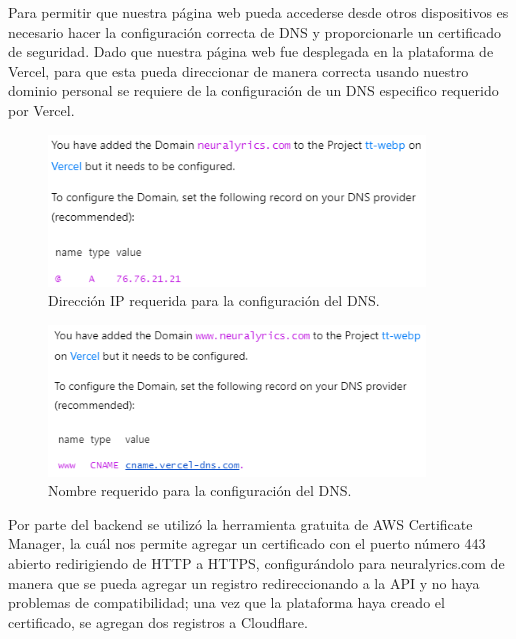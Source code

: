 \documentclass[12pt, a4paper, titlepage]{article}
\begin{document}
	Para permitir que nuestra página web pueda accederse desde otros dispositivos es necesario hacer la configuración correcta de DNS y proporcionarle un certificado de seguridad. Dado que nuestra página web fue desplegada en la plataforma de Vercel, para que esta pueda direccionar de manera correcta usando nuestro dominio personal se requiere de la configuración de un DNS especifico requerido por Vercel.
	\begin{figure}[H] 
		\includegraphics[width=10cm]{./Imagenes/DnsSSL/Dns1.png}
		\centering \caption{Dirección IP requerida para la configuración del DNS.}
	\end{figure}
	\begin{figure}[H] 
		\includegraphics[width=10cm]{./Imagenes/DnsSSL/Dns2.png}
		\centering \caption{Nombre requerido para la configuración del DNS.}
	\end{figure}
	Por parte del backend se utilizó la herramienta gratuita de AWS Certificate Manager, la cuál nos permite agregar un certificado con el puerto número 443 abierto redirigiendo de HTTP a HTTPS, configurándolo para neuralyrics.com de manera que se pueda agregar un registro redireccionando a la API y no haya problemas de compatibilidad; una vez que la plataforma haya creado el certificado, se agregan dos registros a Cloudflare.
	
\end{document}
